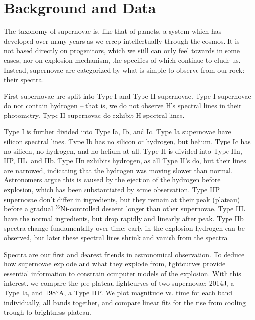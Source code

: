 \section{Background and Data}
The taxonomy of supernovae is, like that of planets, a system which has developed over many years as we creep intellectually through the cosmos. It is not based directly on progenitors, which we still can only feel towards in some cases, nor on explosion mechanism, the specifics of which continue to elude us. Instead, supernovae are categorized by what is simple to observe from our rock: their spectra.

First supernovae are split into Type I and Type II supernovae. Type I supernovae do not contain hydrogen -- that is, we do not observe H's spectral lines in their photometry. Type II supernovae do exhibit H spectral lines.

Type I is further divided into Type Ia, Ib, and Ic. Type Ia supernovae have silicon spectral lines. Type Ib has no silicon or hydrogen, but helium. Type Ic has no silicon, no hydrogen, and no helium at all. Type II is divided into Type IIn, IIP, IIL, and IIb. Type IIn exhibits hydrogen, as all Type II's do, but their lines are narrowed, indicating that the hydrogen was moving slower than normal. Astronomers argue this is caused by the ejection of the hydrogen before explosion, which has been substantiated by some observation. Type IIP supernovae don't differ in ingredients, but they remain at their peak (plateau) before a gradual $^56$Ni-controlled descent longer than other supernovae. Type IIL have the normal ingredients, but drop rapidly and linearly after peak. Type IIb spectra change fundamentally over time: early in the explosion hydrogen can be observed, but later these spectral lines shrink and vanish from the spectra.

Spectra are our first and dearest friends in astronomical observation. To deduce how supernovae explode and what they explode from, lightcurves provide essential information to constrain computer models of the explosion. With this interest. we compare the pre-plateau lightcurves of two supernovae: 2014J, a Type Ia, and 1987A, a Type IIP. We plot magnitude vs. time for each band individually, all bands together, and compare linear fits for the rise from cooling trough to brightness plateau.
